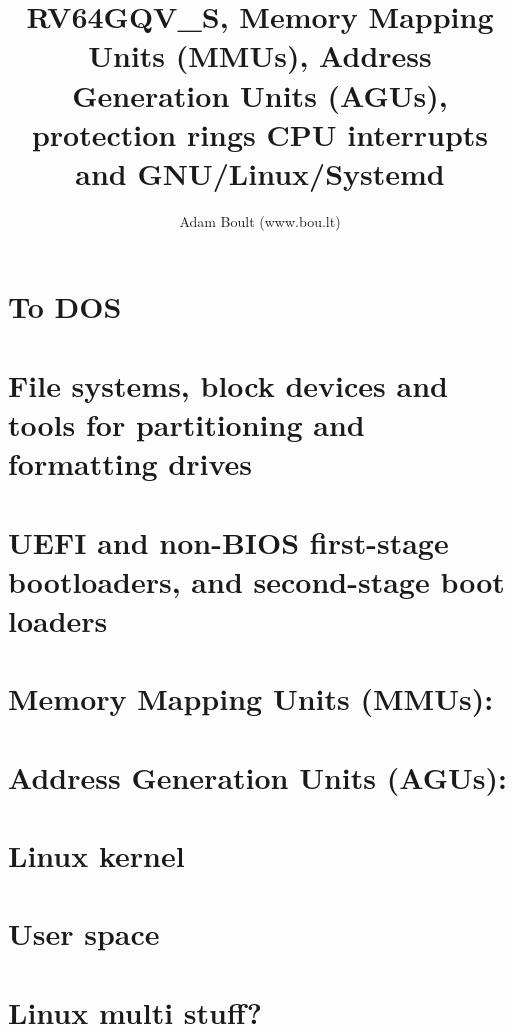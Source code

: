 \documentclass[oneside]{book}
\begin{document}
\author{Adam Boult (www.bou.lt)}
\title{RV64GQV\_S, Memory Mapping Units (MMUs), Address Generation Units (AGUs), protection rings CPU interrupts and GNU/Linux/Systemd}
\maketitle

\setcounter{tocdepth}{0}
\tableofcontents



\part{To DOS}





\part{File systems, block devices and tools for partitioning and formatting drives}






\part{UEFI and non-BIOS first-stage bootloaders, and second-stage boot loaders}



\part{Memory Mapping Units (MMUs):}
\part{Address Generation Units (AGUs): }

\part{Linux kernel}




\part{User space}



\part{Linux multi stuff?}



\end{document}
